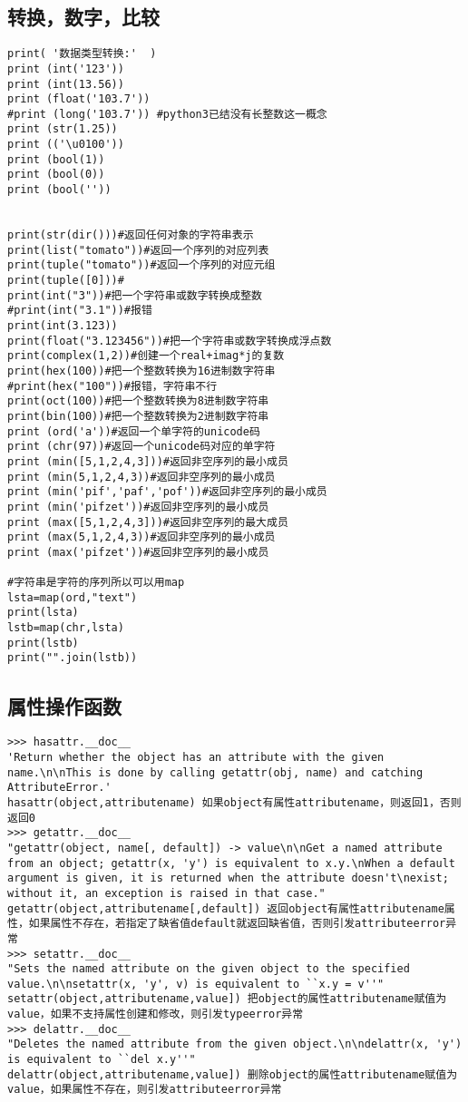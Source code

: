 \documentclass[twoside,11pt]{book}
\begin{document}
\subsection{转换，数字，比较}
\begin{lstlisting}
print( '数据类型转换:'  )
print (int('123'))
print (int(13.56))
print (float('103.7'))
#print (long('103.7')) #python3已结没有长整数这一概念
print (str(1.25))
print (('\u0100'))
print (bool(1))
print (bool(0))
print (bool(''))


print(str(dir()))#返回任何对象的字符串表示
print(list("tomato"))#返回一个序列的对应列表
print(tuple("tomato"))#返回一个序列的对应元组
print(tuple([0]))#
print(int("3"))#把一个字符串或数字转换成整数
#print(int("3.1"))#报错
print(int(3.123))
print(float("3.123456"))#把一个字符串或数字转换成浮点数
print(complex(1,2))#创建一个real+imag*j的复数
print(hex(100))#把一个整数转换为16进制数字符串
#print(hex("100"))#报错，字符串不行
print(oct(100))#把一个整数转换为8进制数字符串
print(bin(100))#把一个整数转换为2进制数字符串
print (ord('a'))#返回一个单字符的unicode码
print (chr(97))#返回一个unicode码对应的单字符
print (min([5,1,2,4,3]))#返回非空序列的最小成员
print (min(5,1,2,4,3))#返回非空序列的最小成员
print (min('pif','paf','pof'))#返回非空序列的最小成员
print (min('pifzet'))#返回非空序列的最小成员
print (max([5,1,2,4,3]))#返回非空序列的最大成员
print (max(5,1,2,4,3))#返回非空序列的最小成员
print (max('pifzet'))#返回非空序列的最小成员

#字符串是字符的序列所以可以用map
lsta=map(ord,"text")
print(lsta)
lstb=map(chr,lsta)
print(lstb)
print("".join(lstb))
\end{lstlisting}

\subsection{属性操作函数}
\begin{lstlisting}
>>> hasattr.__doc__
'Return whether the object has an attribute with the given name.\n\nThis is done by calling getattr(obj, name) and catching AttributeError.'
hasattr(object,attributename) 如果object有属性attributename，则返回1，否则返回0
>>> getattr.__doc__
"getattr(object, name[, default]) -> value\n\nGet a named attribute from an object; getattr(x, 'y') is equivalent to x.y.\nWhen a default argument is given, it is returned when the attribute doesn't\nexist; without it, an exception is raised in that case."
getattr(object,attributename[,default]) 返回object有属性attributename属性，如果属性不存在，若指定了缺省值default就返回缺省值，否则引发attributeerror异常
>>> setattr.__doc__
"Sets the named attribute on the given object to the specified value.\n\nsetattr(x, 'y', v) is equivalent to ``x.y = v''"
setattr(object,attributename,value]) 把object的属性attributename赋值为value，如果不支持属性创建和修改，则引发typeerror异常
>>> delattr.__doc__
"Deletes the named attribute from the given object.\n\ndelattr(x, 'y') is equivalent to ``del x.y''"
delattr(object,attributename,value]) 删除object的属性attributename赋值为value，如果属性不存在，则引发attributeerror异常
\end{lstlisting}
\end{document}
